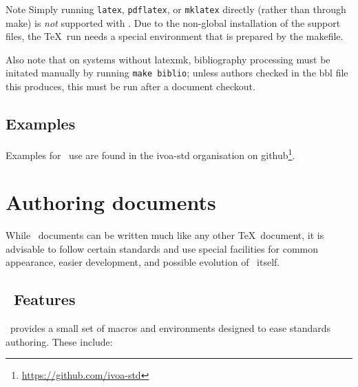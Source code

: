 \documentclass[11pt,a4paper]{ivoa}
\begin{document}
\begin{admonition}{Note}
Simply running \texttt{latex}, \texttt{pdflatex}, 
or \texttt{mklatex} directly
(rather than through make) is \emph{not} supported with \ivoatex.  Due
to the non-global installation of the support files, the \TeX\ run needs
a special environment that is prepared by the makefile.

Also note that on systems without latexmk,
bibliography processing must be initated manually by
running \texttt{make biblio}; unless authors checked in the bbl file
this produces, this must be run after a document checkout.
\end{admonition}

\subsection{Examples}

Examples for \ivoatex\ use are found in the ivoa-std organisation on
github\footnote{\url{https://github.com/ivoa-std}}.


\section{Authoring documents}
\label{sect:authoring}

While \ivoatex\ documents can be written much like any other \TeX\
document, it is advisable to follow certain standards and use special
facilities for common appearance, easier development, and possible
evolution of \ivoatex\ itself.

\subsection{\ivoatex\ Features}

\ivoatex\ provides a small set of macros and environments designed
to ease standards authoring.  These include:
\end{document}
